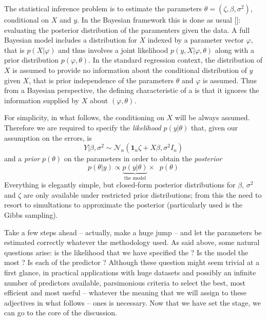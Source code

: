 \documentclass[11 pt]{article}
\begin{document}
\begin{multicols}{2}
The statistical inference problem is to estimate the parameters $\theta = (\zeta, \beta, \sigma^2)$, conditional on $X$ and $y$. In the Bayesian framework this is done as usual [\cite{Gelman2004}]: evaluating the posterior distribution of the paramenters given the data.
A full Bayesian model includes a distribution for $X$ indexed by a parameter vector $\varphi$, that is $p(X|\varphi)$ and thus involves a joint likelihood $p(y, X|\varphi, \theta)$ along with a prior distribution $p(\varphi, \theta)$. 
In the standard regression context, the distribution of $X$ is assumed to provide no information about the conditional distribution of $y$ given $X$, that is prior independence of the parameters $\theta$ and $\varphi$ is assumed. Thus from a Bayesian perspective, the defining characteristic of a  is that it ignores the information supplied by $X$ about $(\varphi, \theta)$. 

For simplicity, in what follows, the conditioning on $X$ will be always assumed. Therefore we are required to specify the \textit{likelihood} $p(y|\theta)$ that, given our assumption on the errors, is 
\begin{equation*}
    Y|\beta,\sigma^2 \sim \mathcal{N}_n(\mathbf{1}_n\zeta + X\beta, \sigma^2 I_n) 
\end{equation*}
and a \textit{prior} $p(\theta)$ on the parameters in order to obtain the \textit{posterior}
\begin{equation*}
    p(\theta|y) \propto \underbrace{p(y|\theta)}_{\text{the model}} \times  \;\;p(\theta)
\end{equation*}
Everything is elegantly simple, but closed-form posterior distributions for $\beta$, $\sigma^2$ and $\zeta$ are only available under restricted prior distributions; from this the need to resort to simultations to approximate the posterior (particularly used is the Gibbs sampling).

Take a few steps ahead -- actually, make a huge jump -- and let the parameters be estimated correctly whatever the methodology used. As said above, some natural questions arise: is the likelihood that we have specified the ? Is the model the most ? Is each of the predictor ? Although these question might seem trivial at a first glance, in practical applications with huge datasets and possibly an infinite number of predictors available, parsimonious criteria to select the best, most efficient and most useful -- whatever the meaning that we will assign to these adjectives in what follows -- ones is necessary. Now that we have set the stage, we can go to the core of the discussion.




\end{multicols}
\end{document}
